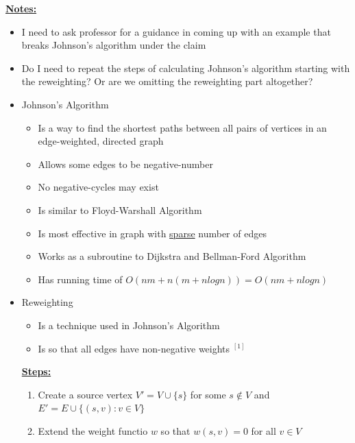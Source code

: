 \documentclass[12pt]{article}
\begin{document}
\begin{enumerate}[1.]
    \bigskip

    \underline{\textbf{Notes:}}

    \bigskip

    \begin{itemize}
        \item I need to ask professor for a guidance in coming up with an example that breaks Johnson's algorithm
        under the claim
        \item Do I need to repeat the steps of calculating Johnson's algorithm starting with the reweighting? Or are
        we omitting the reweighting part altogether?
        \item Johnson's Algorithm

        \begin{itemize}
            \item Is a way to find the shortest paths between all pairs of vertices
            in an edge-weighted, directed graph
            \item Allows some edges to be negative-number
            \item No negative-cycles may exist
            \item Is similar to Floyd-Warshall Algorithm
            \item Is most effective in graph with \underline{sparse} number of edges
            \item Works as a subroutine to Dijkstra and Bellman-Ford Algorithm
            \item Has running time of $O(nm + n(m + n log n)) = O(nm + nlog n)$
        \end{itemize}

        \item Reweighting
        \begin{itemize}
            \item Is a technique used in Johnson's Algorithm
            \item Is so that all edges have non-negative weights $^{[1]}$
        \end{itemize}

        \bigskip

        \underline{\textbf{Steps:}}

        \begin{enumerate}[1.]
            \item Create a source vertex $V' = V \cup \{s\}$ for some $s \notin V$ and $E' = E \cup \{(s,v): v \in V\}$
            \item Extend the weight functio $w$ so that $w(s,v) = 0$ for all $v \in V$


\end{enumerate}
\end{itemize}
\end{enumerate}
\end{document}
